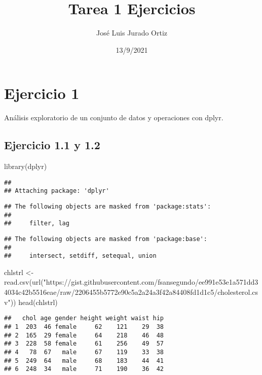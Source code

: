 \documentclass[
]{article}
\title{Tarea 1 Ejercicios}
\author{José Luis Jurado Ortiz}
\date{13/9/2021}
\newenvironment{Shaded}{\begin{snugshade}}{\end{snugshade}}
\newcommand{\FunctionTok}[1]{\textcolor[rgb]{0.00,0.00,0.00}{#1}}
\newcommand{\NormalTok}[1]{#1}
\newcommand{\OtherTok}[1]{\textcolor[rgb]{0.56,0.35,0.01}{#1}}
\newcommand{\StringTok}[1]{\textcolor[rgb]{0.31,0.60,0.02}{#1}}
\begin{document}
\maketitle

\hypertarget{ejercicio-1}{%
\section{Ejercicio 1}\label{ejercicio-1}}

Análisis exploratorio de un conjunto de datos y operaciones con dplyr.

\hypertarget{ejercicio-1.1-y-1.2}{%
\subsection{Ejercicio 1.1 y 1.2}\label{ejercicio-1.1-y-1.2}}

\begin{Shaded}
\begin{Highlighting}[]
\FunctionTok{library}\NormalTok{(dplyr)}
\end{Highlighting}
\end{Shaded}

\begin{verbatim}
## 
## Attaching package: 'dplyr'
\end{verbatim}

\begin{verbatim}
## The following objects are masked from 'package:stats':
## 
##     filter, lag
\end{verbatim}

\begin{verbatim}
## The following objects are masked from 'package:base':
## 
##     intersect, setdiff, setequal, union
\end{verbatim}

\begin{Shaded}
\begin{Highlighting}[]
\NormalTok{chlstrl }\OtherTok{\textless{}{-}} \FunctionTok{read.csv}\NormalTok{(}\FunctionTok{url}\NormalTok{(}\StringTok{"https://gist.githubusercontent.com/fsansegundo/ee991e53e1a571dd34034c42b5516eae/raw/2206455b5772e90c5a2a24a3f42a84408fd1d1c5/cholesterol.csv"}\NormalTok{))}
\FunctionTok{head}\NormalTok{(chlstrl)}
\end{Highlighting}
\end{Shaded}

\begin{verbatim}
##   chol age gender height weight waist hip
## 1  203  46 female     62    121    29  38
## 2  165  29 female     64    218    46  48
## 3  228  58 female     61    256    49  57
## 4   78  67   male     67    119    33  38
## 5  249  64   male     68    183    44  41
## 6  248  34   male     71    190    36  42
\end{verbatim}
\end{document}
